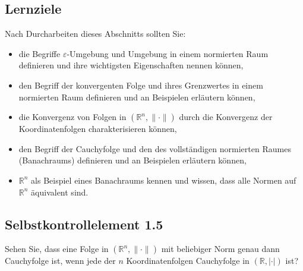 \documentclass[a4paper,12pt]{article}
\begin{document}
\subsection*{Lernziele}

Nach Durcharbeiten dieses Abschnitts sollten Sie:
\begin{itemize}
  \item die Begriffe $\varepsilon$-Umgebung und Umgebung in einem normierten Raum
        definieren und ihre wichtigsten Eigenschaften nennen können,
  \item den Begriff der konvergenten Folge und ihres Grenzwertes in einem normierten
        Raum definieren und an Beispielen erläutern können,
  \item die Konvergenz von Folgen in $(\mathbb{R}^n, \|\cdot\|)$ durch die Konvergenz der
        Koordinatenfolgen charakterisieren können,
  \item den Begriff der Cauchyfolge und den des vollständigen normierten Raumes
        (Banachraums) definieren und an Beispielen erläutern können,
  \item $\mathbb{R}^n$ als Beispiel eines Banachraums kennen und wissen, dass alle Normen
        auf $\mathbb{R}^n$ äquivalent sind.
\end{itemize}

\subsection*{Selbstkontrollelement 1.5}

Sehen Sie, dass eine Folge in $(\mathbb{R}^n, \|\cdot\|)$ mit beliebiger Norm genau
dann Cauchyfolge ist, wenn jede der $n$ Koordinatenfolgen Cauchyfolge in
$(\mathbb{R}, |\cdot|)$ ist?
\end{document}
